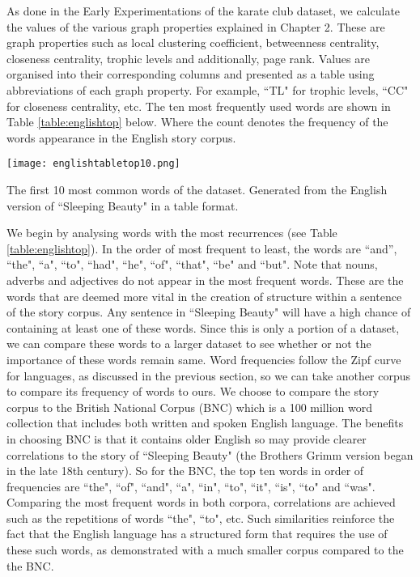 As done in the Early Experimentations of the karate club dataset, we calculate the values of the various graph properties explained in Chapter 2. These are graph properties such as local clustering coefficient, betweenness centrality, closeness centrality, trophic levels and additionally, page rank. Values are organised into their corresponding columns and presented as a table using abbreviations of each graph property. For example, ``TL" for trophic levels, ``CC" for closeness centrality, etc. The ten most frequently used words are shown in Table \ref{table:englishtop} below. Where the count denotes the frequency of the words appearance in the English story corpus. 

\begin{table}[!htb]
\centering
\texttt{[image: englishtabletop10.png]}
\caption{The first 10 most common words of the dataset. Generated from the English version of ``Sleeping Beauty" in a table format.}
\label{table:englishtop}
\end{table}

We begin by analysing words with the most recurrences (see Table \ref{table:englishtop}). In the order of most frequent to least, the words are ``and'', ``the", ``a", ``to", ``had", ``he", ``of", ``that", ``be" and ``but". Note that nouns, adverbs and adjectives do not appear in the most frequent words. These are the words that are deemed more vital in the creation of structure within a sentence of the story corpus. Any sentence in ``Sleeping Beauty" will have a high chance of containing at least one of these words. Since this is only a portion of a dataset, we can compare these words to a larger dataset to see whether or not the importance of these words remain same. Word frequencies follow the Zipf curve for languages, as discussed in the previous section, so we can take another corpus to compare its frequency of words to ours. We choose to compare the story corpus to the British National Corpus (BNC) \cite{bnc2007british} which is a 100 million word collection that includes both written and spoken English language. The benefits in choosing BNC is that it contains older English so may provide clearer correlations to the story of ``Sleeping Beauty" (the Brothers Grimm version began in the late 18th century). So for the BNC, the top ten words \cite{leech2014word} in order of frequencies are ``the", ``of", ``and", ``a", ``in", ``to", ``it", ``is", ``to" and ``was". Comparing the most frequent words in both corpora, correlations are achieved such as the repetitions of words ``the", ``to", etc. Such similarities reinforce the fact that the English language has a structured form that requires the use of these such words, as demonstrated with a much smaller corpus compared to the the BNC.

